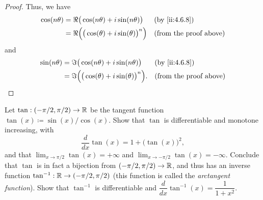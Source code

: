 \begin{proof}
  Thus, we have
  \begin{align*}
    \cos(n \theta) & = \Re\big(\cos(n \theta) + i \sin(n \theta)\big)         &  & \by{ii:4.6.8}                 \\
                   & = \Re\Big(\big(\cos(\theta) + i \sin(\theta)\big)^n\Big) &  & \text{(from the proof above)}
  \end{align*}
  and
  \begin{align*}
    \sin(n \theta) & = \Im\big(\cos(n \theta) + i \sin(n \theta)\big)          &  & \by{ii:4.6.8}                 \\
                   & = \Im\Big(\big(\cos(\theta) + i \sin(\theta)\big)^n\Big). &  & \text{(from the proof above)}
  \end{align*}
\end{proof}

\begin{ex}\label{ii:ex:4.7.8}
  Let \(\tan : (- \pi / 2, \pi / 2) \to \mathbb{R}\) be the tangent function \(\tan(x) \coloneqq \sin(x) / \cos(x)\).
  Show that \(\tan\) is differentiable and monotone increasing, with
  \[
    \dfrac{d}{dx} \tan(x) = 1 + \big(\tan(x)\big)^2,
  \]
  and that \(\lim_{x \to \pi / 2} \tan(x) = +\infty\) and \(\lim_{x \to -\pi / 2} \tan(x) = -\infty\).
  Conclude that \(\tan\) is in fact a bijection from \((- \pi / 2, \pi / 2) \to \mathbb{R}\), and thus has an inverse function \(\tan^{-1} : \mathbb{R} \to (- \pi / 2, \pi / 2)\)
  (this function is called the \emph{arctangent function}).
  Show that \(\tan^{-1}\) is differentiable and \(\dfrac{d}{dx} \tan^{-1}(x) = \dfrac{1}{1 + x^2}\).
\end{ex}

